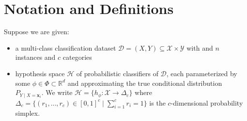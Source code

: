 \documentclass[12pt]{article}
\newtheorem{definition}{Definition}
\begin{document}
 

\rhead{\today}
 

\section{Notation and Definitions}
 
  

Suppose we are given:
\begin{itemize}
    \item a multi-class classification dataset $\mathcal{D}=(X,Y)\subseteq \mathcal{X}\times \mathcal{Y}$ with and $n$ instances and $c$ categories
    \item hypothesis space $\mathcal{H}$ of probabilistic classifiers of $\mathcal{D}$, each parameterized by some $\phi \in \Phi \subset \mathbb{R}^d$ and approximating the true conditional distribution $P_{Y\mid X=\mathbf{x}_i}$. We write $\mathcal{H}=\{h_\phi :\mathcal{X} \rightarrow \Delta_c\}$ where $\Delta_c = \{(r_1,\ldots,r_c)\in [0,1]^c\mid \sum_{i=1}^c r_i = 1\}$ is the $c$-dimensional probability simplex.
\end{itemize}


\pagebreak
\end{document}
